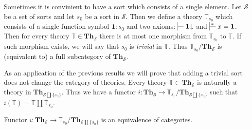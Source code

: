 \documentclass[reqno]{amsart}
\theoremstyle{definition}
\theoremstyle{remark}
\newcommand{\cat}[1]{\mathbf{#1}}
\newcommand{\Th}{\cat{Th}}
\newcommand{\emptyCtx}{\mathbf{1}}
\numberwithin{figure}{section}
\begin{document}
Sometimes it is convinient to have a sort which consists of a single element.
Let $\mathcal{S}$ be a set of sorts and let $s_0$ be a sort in $\mathcal{S}$.
Then we define a theory $\mathbb{T}_{s_0}$ which consists of a single function symbol $\emptyCtx : s_0$
    and two axioms: $\sststile{}{} \emptyCtx\!\downarrow$ and $\sststile{}{x} x = \emptyCtx$.
Then for every theory $\mathbb{T} \in \Th_\mathcal{S}$ there is at most one morphism from $\mathbb{T}_{s_0}$ to $\mathbb{T}$.
If such morphism exists, we will say that $s_0$ is \emph{trivial} in $\mathbb{T}$.
Thus $\mathbb{T}_{s_0}/\Th_\mathcal{S}$ is (equivalent to) a full subcategory of $\Th_\mathcal{S}$.

As an application of the previous results we will prove that adding a trivial sort does not change the category of theories.
Every theory $\mathbb{T} \in \Th_\mathcal{S}$ is naturally a theory in $\Th_{\mathcal{S} \amalg \{ s_0 \}}$.
Thus we have a functor $i : \Th_\mathcal{S} \to \mathbb{T}_{s_0}/\Th_{\mathcal{S} \amalg \{ s_0 \}}$ such that $i(\mathbb{T}) = \mathbb{T} \amalg \mathbb{T}_{s_0}$.
\begin{prop}
Functor $i : \Th_\mathcal{S} \to \mathbb{T}_{s_0}/\Th_{\mathcal{S} \amalg \{ s_0 \}}$ is an equivalence of categories.
\end{prop}
\end{document}
